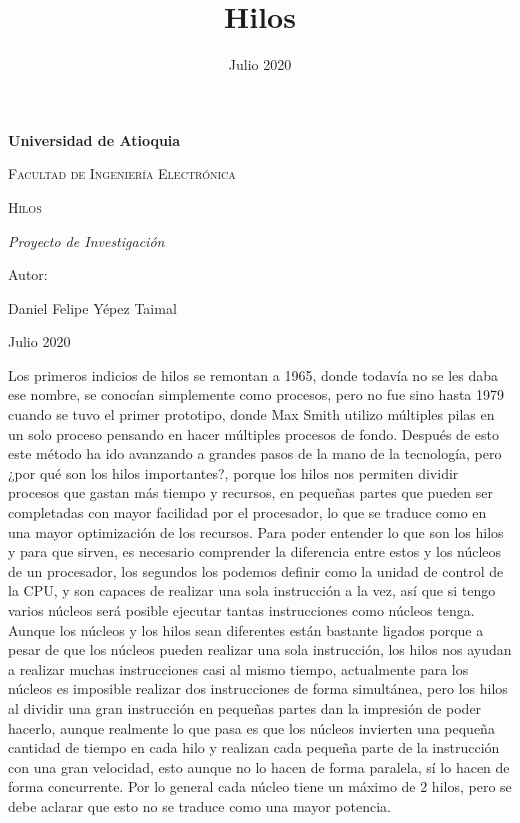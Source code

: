 \documentclass{article}
\title{Hilos}
\date{Julio 2020}
\begin{document}
\begin{titlepage}
\centering
{\bfseries\LARGE Universidad de Atioquia\par}
\vspace{1cm}
{\scshape\Large Facultad de Ingenier\'ia Electr\'onica \par}
\vspace{3cm}
{\scshape\Huge Hilos \par}
\vspace{3cm}
{\itshape\Large Proyecto de Investigaci\'on \par}
\vfill
{\Large Autor: \par}
{\Large Daniel Felipe Y\'epez Taimal \par}
\vfill
{\Large Julio 2020 \par}
\end{titlepage}

\maketitle


Los primeros indicios de hilos se remontan a 1965, donde todavía no se les daba ese nombre, se conocían simplemente como procesos, pero no fue sino hasta 1979 cuando se tuvo el primer prototipo, donde Max Smith utilizo múltiples pilas en un solo proceso pensando en hacer múltiples procesos de fondo. Después de esto este método ha ido avanzando a grandes pasos de la mano de la tecnología, pero ¿por qué son los hilos importantes?, porque los hilos nos permiten dividir procesos que gastan más tiempo y recursos, en pequeñas partes que pueden ser completadas con mayor facilidad por el procesador, lo que se traduce como en una mayor optimización de los recursos. Para poder entender lo que son los hilos y para que sirven, es necesario comprender la diferencia entre estos y los núcleos de un procesador, los segundos los podemos definir como la unidad de control de la CPU, y son capaces de realizar una sola instrucción a la vez, así que si tengo varios núcleos será posible ejecutar tantas instrucciones como núcleos tenga. \\

Aunque los núcleos y los hilos sean diferentes están bastante ligados porque a pesar de que los núcleos pueden realizar una sola instrucción, los hilos nos ayudan a realizar muchas instrucciones casi al mismo tiempo, actualmente para los núcleos es imposible realizar dos instrucciones de forma simultánea, pero los hilos al dividir una gran instrucción en pequeñas partes dan la impresión de poder hacerlo, aunque realmente lo que pasa es que  los núcleos invierten una pequeña cantidad de tiempo en cada hilo y realizan cada pequeña parte de la instrucción con una gran velocidad, esto aunque no lo hacen de forma paralela, sí lo hacen de forma concurrente. Por lo general cada núcleo tiene un máximo de 2 hilos, pero se debe aclarar que esto no se traduce como una mayor potencia.\\
\end{document}

